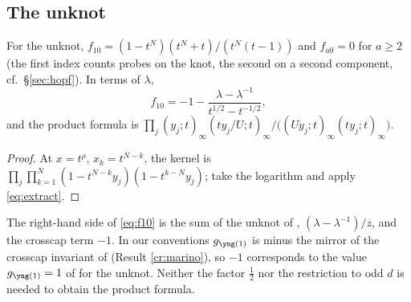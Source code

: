 \subsection{The unknot}\label{sec:unknot}
\begin{proposition}\label{prop:unknot}
For the unknot, $f_{10} = (1 - t^N)(t^N + t)/(t^N(t-1))$ and $f_{a0} = 0$ for $a \ge 2$ (the first index counts probes on the knot, the second on a second component, cf.\ \S\ref{sec:hopf}). In terms of $\lambda$,
\begin{equation}\label{eq:f10}
f_{10} = -1 - \frac{\lambda - \lambda^{-1}}{t^{1/2} - t^{-1/2}},
\end{equation}
and the product formula is $\prod_j (y_j; t)_\infty (t y_j/U; t)_\infty / \bigl((U y_j; t)_\infty (t y_j; t)_\infty\bigr)$.
\end{proposition}
\begin{proof}
At $x = t^\rho$, $x_k = t^{N-k}$, the kernel is $\prod_j\prod_{k=1}^{N}(1 - t^{N-k}y_j)(1 - t^{k-N}y_j)$; take the logarithm and apply \eqref{eq:extract}.
\end{proof}
The right-hand side of \eqref{eq:f10} is the sum of the unknot of \cite{Marino09}, $(\lambda - \lambda^{-1})/z$, and the crosscap term $-1$. In our conventions $g_{\yone}$ is minus the mirror of the crosscap invariant of \cite{Marino09} (Result \ref{cr:marino}), so $-1$ corresponds to the value $g_{\yone} = 1$ of \cite{Marino09} for the unknot. Neither the factor $\tfrac12$ nor the restriction to odd $d$ is needed to obtain the product formula.
